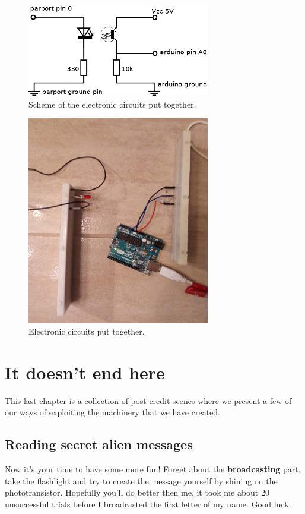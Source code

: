 \documentclass[12pt]{report}
\begin{document}
\begin{figure}[H]
\centering\includegraphics[width=8cm]{scheme}
\caption{Scheme of the electronic circuits put together.}				
\label{fig:circuits}
\end{figure}

\begin{figure}[H]
\centering\includegraphics[width=8cm]{circuits}
\caption{Electronic circuits put together.}				
\label{fig:circuits_pic}
\end{figure}



\chapter{It doesn't end here}

This last chapter is a collection of post-credit scenes where we present a few of our ways of exploiting the machinery that we have created.

\section{Reading secret alien messages}

Now it's your time to have some more fun! Forget about the \textbf{broadcasting} part, take the flashlight and try to create the message yourself by shining on the phototransistor. Hopefully you'll do better then me, it took me about 20 unsuccessful trials before I broadcasted the first letter of my name. Good luck.
\end{document}
